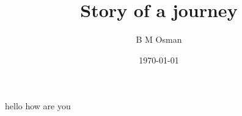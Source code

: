 \documentclass{article}
\title{Story of a journey}
\author{B M Osman}
\date{\today}
\begin{document}
\maketitle
\begin{center}
hello  how are you


\end{center}
\end{document}
